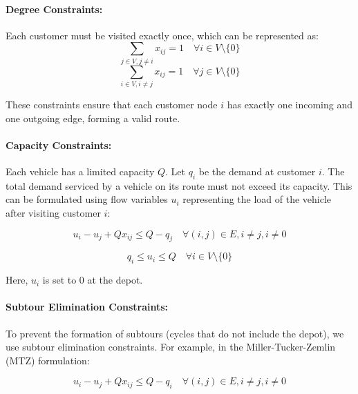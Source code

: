 \documentclass{article}
\begin{document}
    \paragraph{Degree Constraints:}
    Each customer must be visited exactly once, which can be represented as:
    \begin{equation}
        \sum_{j \in V, j \neq i} x_{ij} = 1 \quad \forall i \in V \setminus \{0\}
    \end{equation}
    \begin{equation}
        \sum_{i \in V, i \neq j} x_{ij} = 1 \quad \forall j \in V \setminus \{0\}
    \end{equation}

    These constraints ensure that each customer node \( i \) has exactly one incoming and one outgoing edge, forming a valid route. \cite[pp. 3--5, 62--65]{toth2014vehicle}

    \paragraph{Capacity Constraints:}
    Each vehicle has a limited capacity \( Q \). Let \( q_i \) be the demand at customer \( i \). The total demand serviced by a vehicle on its route must not exceed its capacity. This can be formulated using flow variables \( u_i \) representing the load of the vehicle after visiting customer \( i \):

    \begin{equation}
        u_i - u_j + Q x_{ij} \leq Q - q_j \quad \forall (i, j) \in E, i \neq j, i \neq 0
    \end{equation}

    \begin{equation}
        q_i \leq u_i \leq Q \quad \forall i \in V \setminus \{0\}
    \end{equation}

    Here, \( u_i \) is set to 0 at the depot. \cite[pp. 3--5, 62--65]{toth2014vehicle}

    \paragraph{Subtour Elimination Constraints:}
    To prevent the formation of subtours (cycles that do not include the depot), we use subtour elimination constraints. For example, in the Miller-Tucker-Zemlin (MTZ) formulation:

    \begin{equation}
        u_i - u_j + Q x_{ij} \leq Q - q_i \quad \forall (i, j) \in E, i \neq j, i \neq 0
    \end{equation}
\end{document}
